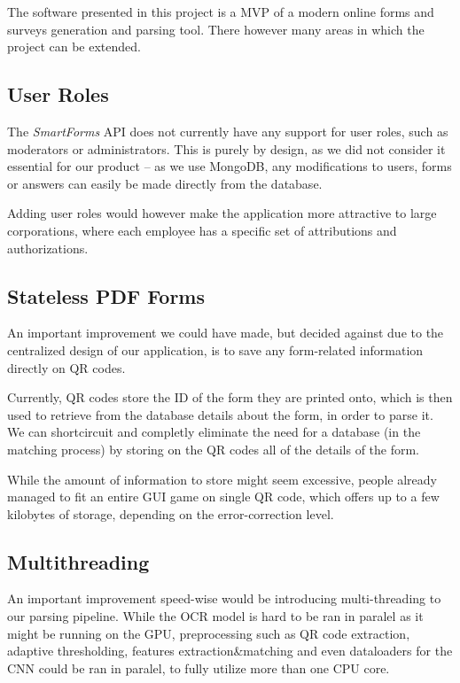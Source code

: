 \documentclass[11pt, a4paper]{report}
\begin{document}
The software presented in this project is a MVP of a modern online forms and surveys generation and parsing tool. There however many areas in which the project can be extended.

\subsection{User Roles}

The \textit{SmartForms} API does not currently have any support for user roles, such as moderators or administrators. This is purely by design, as we did not consider it essential for our product -- as we use MongoDB, any modifications to users, forms or answers can easily be made directly from the database.

Adding user roles would however make the application more attractive to large corporations, where each employee has a specific set of attributions and authorizations.

\subsection{Stateless PDF Forms}

An important improvement we could have made, but decided against due to the centralized design of our application, is to save any form-related information directly on QR codes.

Currently, QR codes store the ID of the form they are printed onto, which is then used to retrieve from the database details about the form, in order to parse it. We can shortcircuit and completly eliminate the need for a database (in the matching process) by storing on the QR codes all of the details of the form.

While the amount of information to store might seem excessive, people already managed to fit an entire GUI game on single QR code\cite{game-qr-code}, which offers up to a few kilobytes of storage, depending on the error-correction level.

\subsection{Multithreading}

An important improvement speed-wise would be introducing multi-threading to our parsing pipeline. While the OCR model is hard to be ran in paralel as it might be running on the GPU, preprocessing such as QR code extraction, adaptive thresholding, features extraction\&matching and even dataloaders for the CNN could be ran in paralel, to fully utilize more than one CPU core. 
\end{document}
